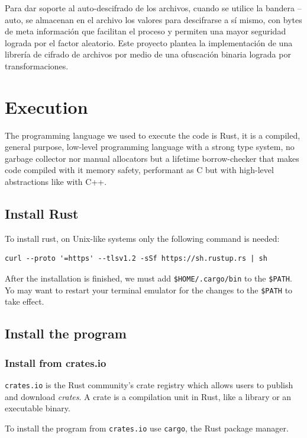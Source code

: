 Para dar soporte al auto-descifrado de los archivos, cuando se utilice la
bandera --auto, se almacenan en el archivo los valores para descifrarse a sí
mismo, 
con bytes de meta información que facilitan el proceso y permiten una mayor
seguridad lograda por el factor aleatorio. Este proyecto plantea la
implementación 
de una librería de cifrado de archivos por medio de una ofuscación binaria
lograda por transformaciones.

\newpage
\section{Execution}

The programming language we used to execute the code is Rust, it is a compiled,
general purpose, low-level programming language with a strong type system,
no garbage collector nor manual allocators but a lifetime borrow-checker that
makes code compiled with it memory safety, performant as C but with high-level
abstractions like with C++.

\subsection{Install Rust}

To install rust, on Unix-like systems only the following command is needed:

\begin{verbatim}
curl --proto '=https' --tlsv1.2 -sSf https://sh.rustup.rs | sh
\end{verbatim}

After the installation is finished, we must add \texttt{\$HOME/.cargo/bin} to the \texttt{\$PATH}.
Yo may want to restart your terminal emulator for the changes to the \texttt{\$PATH} to take effect.

\subsection{Install the program}

\subsubsection{Install from crates.io}

\texttt{crates.io} is the Rust community’s crate registry which allows users to publish and download \textit{crates}.
A crate is a compilation unit in Rust, like a library or an executable binary.

To install the program from \texttt{crates.io} use \texttt{cargo}, the Rust package manager.


